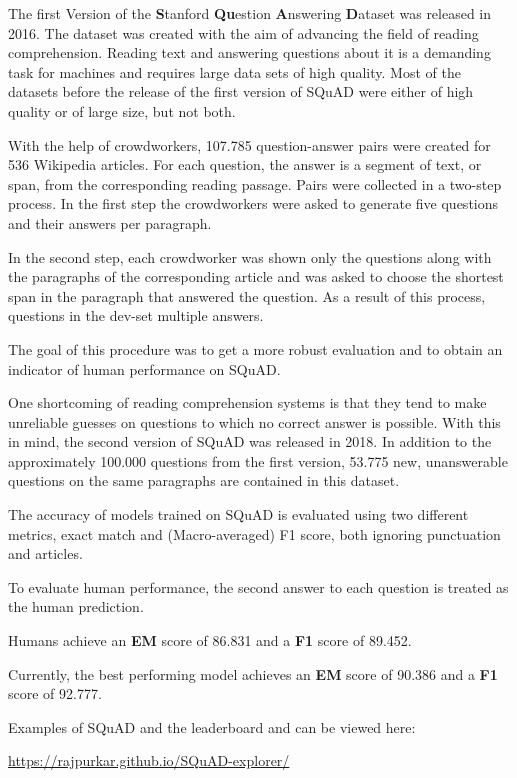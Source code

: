 \documentclass[]{krantz}
\begin{document}
The first Version of the \textbf{S}tanford \textbf{Qu}estion \textbf{A}nswering \textbf{D}ataset was released in 2016. The dataset was created with the aim of advancing the field of reading comprehension. Reading text and answering questions about it is a demanding task for machines and requires large data sets of high quality. Most of the datasets before the release of the first version of SQuAD were either of high quality or of large size, but not both.

With the help of crowdworkers, 107.785 question-answer pairs were created for 536 Wikipedia articles. For each question, the answer is a segment of text, or span, from the corresponding reading passage.
Pairs were collected in a two-step process. In the first step the crowdworkers were asked to generate five questions and their answers per paragraph.

In the second step, each crowdworker was shown only the questions along with the paragraphs of the corresponding article and was asked to choose the shortest span in the paragraph that answered the question. As a result of this process, questions in the dev-set multiple answers.

The goal of this procedure was to get a more robust evaluation and to obtain an indicator of human performance on SQuAD.

One shortcoming of reading comprehension systems is that they tend to make unreliable guesses on questions to which no correct answer is possible. With this in mind, the second version of SQuAD was released in 2018. In addition to the approximately 100.000 questions from the first version, 53.775 new, unanswerable questions on the same paragraphs are contained in this dataset.

The accuracy of models trained on SQuAD is evaluated using two different metrics, exact match and (Macro-averaged) F1 score, both ignoring punctuation and articles.

To evaluate human performance, the second answer to each question is treated as the human prediction.\citep{rajpurkar2016squad, rajpurkar2018know}

Humans achieve an \textbf{EM} score of 86.831 and a \textbf{F1} score of 89.452.

Currently, the best performing model achieves an \textbf{EM} score of 90.386 and a \textbf{F1} score of 92.777.

Examples of SQuAD and the leaderboard and can be viewed here:

\center \url{https://rajpurkar.github.io/SQuAD-explorer/}
\end{document}
